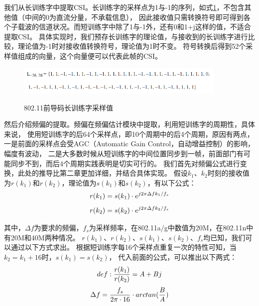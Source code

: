 	我们从长训练字中提取CSI。长训练字的采样点为1与-1的序列，如式\ref{fig:80211_lts_sequence}，不包含其他值（中间的0为直流分量，不承载信息），
	因此接收值只需转换符号即可得到各个子载波的信道状况。而短训练字中除了1与-1外，还有0和1+j这样的值，不适合提取CSI。
	具体实现时，我们预存长训练字的理论值，与接收到的长训练字进行比较，理论值为-1时对接收值转换符号，理论值为1时不变。
	符号转换后得到52个采样值组成的向量，这个向量便可以代表此帧的CSI。

		\begin{figure}
			\centering
			\includegraphics[width=0.9\textwidth]{img/80211_lts_sequence.png}
			\caption{802.11前导码长训练字采样值}
			\label{fig:80211_lts_sequence}
			\cite{ieee80211}
		\end{figure}

	然后介绍频偏的提取。频偏在频偏估计模块中提取，利用短训练字的周期性，具体来说，
	使用短训练字的后64个采样点，即10个周期中的后4个周期，原因有两点，
	一是前面的采样点会受AGC（Automatic Gain Control，自动增益控制）的影响，幅度有波动，
	二是大多数时候从短训练字的中间位置同步到一帧，前面部门有可能同步不到，而后4个周期实践表明是切实可行的。
	我们首先对频偏公式进行变换，此处的推导比第二章更加详细，并结合具体实现。
	假设$k_1$、$k_2$时刻的接收值为$r(k_1)$和$r(k_2)$，理论值为$s(k_1)$和$s(k_2)$，有以下公式：
		\begin{equation}
			\centering
			r(k_1)=s(k_1) \cdot e^{j2 \pi \Delta fk_1 / f_s}
			\label{fig:freq_offseet_rs_1}
		\end{equation}
		\begin{equation}
			\centering
			r(k_2)=s(k_2) \cdot e^{j2 \pi \Delta fk_2 / f_s}
			\label{fig:freq_offseet_rs_2}
		\end{equation}

	其中，$\Delta f$为要求的频偏，$f_s$为采样频率，在802.11a/g中数值为20M，在802.11n中有20M和40M两种情况。
	$r(k_1)$、$r(k_2)$、$s(k_1)$、$s(k_2)$、$f_s$均已知，我们可以通过以下方式求出。
	根据短训练字每16个采样点重复一次的特性可知，当$k_2 = k_1 + 16$时，$s(k_1) = s(k_2)$，
	代入前面的公式，可以推出以下两式：
		\begin{equation}
			\centering
			def: \frac{r(k_1)}{r(k_2)} = A + Bj
			\label{fig:freq_offseet_AB_def}
		\end{equation}
		\begin{equation}
			\centering
			\Delta f = \frac{f_s}{2\pi \cdot 16} \cdot arctan(\frac{B}{A})
			\label{fig:freq_offseet_result}
		\end{equation}


